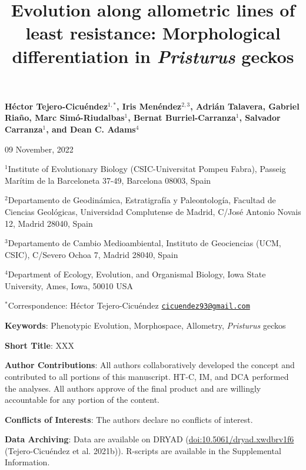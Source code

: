 \documentclass[
  11pt,
]{article}
\title{Evolution along allometric lines of least resistance:
Morphological differentiation in \emph{Pristurus} geckos}
\author{}
\date{\vspace{-2.5em}}
\begin{document}
\maketitle

\begin{center}
\textbf{H{\'{e}}ctor Tejero-Cicu{\'{e}}ndez$^{1,*}$,  Iris Men{\'{e}}ndez$^{2,3}$, Adri{\'{a}}n Talavera, Gabriel Riaño, Marc Sim{\'{o}}-Riudalbas$^{1}$, Bernat Burriel-Carranza$^{1}$, Salvador Carranza$^{1}$, and Dean C. Adams$^{4}$}
\end{center}

\begin{center}09 November, 2022\end{center}

\(^{1}\)Institute of Evolutionary Biology (CSIC-Universitat Pompeu
Fabra), Passeig Marítim de la Barceloneta 37-49, Barcelona 08003, Spain

\(^{2}\)Departamento de Geodinámica, Estratigrafía y Paleontología,
Facultad de Ciencias Geológicas, Universidad Complutense de Madrid,
C/José Antonio Novais 12, Madrid 28040, Spain

\(^{3}\)Departamento de Cambio Medioambiental, Instituto de Geociencias
(UCM, CSIC), C/Severo Ochoa 7, Madrid 28040, Spain

\(^{4}\)Department of Ecology, Evolution, and Organismal Biology, Iowa
State University, Ames, Iowa, 50010 USA

\(^{*}\)Correspondence: Héctor Tejero-Cicuéndez
\href{mailto:cicuendez93@gmail.com}{\nolinkurl{cicuendez93@gmail.com}}

\hfill\break

\textbf{Keywords}: Phenotypic Evolution, Morphospace, Allometry,
\emph{Pristurus} geckos \hfill\break

\textbf{Short Title}: XXX \hfill\break

\textbf{Author Contributions}: All authors collaboratively developed the
concept and contributed to all portions of this manuscript. HT-C, IM,
and DCA performed the analyses. All authors approve of the final product
and are willingly accountable for any portion of the
content.\hfill\break

\textbf{Conflicts of Interests}: The authors declare no conflicts of
interest.\hfill\break

\textbf{Data Archiving}: Data are available on DRYAD
(\url{doi:10.5061/dryad.xwdbrv1f6} (Tejero-Cicuéndez et al. 2021b)).
R-scripts are available in the Supplemental Information. \hfill\break
\end{document}
